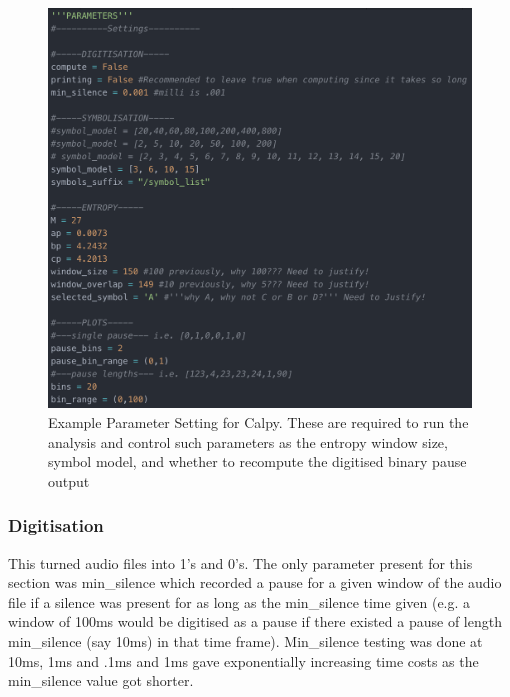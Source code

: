 \begin{figure}[htbp]
	\begin{center}
		\includegraphics[scale=0.6]{src/main-matter/methodology/code-base/code/parameters}
		\caption{Example Parameter Setting for Calpy. These are required to run the analysis and control such parameters as the entropy window size, symbol model, and whether to recompute the digitised binary pause output}
		\label{default}
	\end{center}
\end{figure}

\subsubsection{Digitisation}
This turned audio files into 1's and 0's. The only parameter present for this section was min\_silence which recorded a pause for a given window of the audio file if a silence was present for as long as the min\_silence time given (e.g. a window of 100ms would be digitised as a pause if there existed a pause of length min\_silence (say 10ms) in that time frame). Min\_silence testing was done at 10ms, 1ms and .1ms and 1ms gave exponentially increasing time costs as the min\_silence value got shorter. \\

